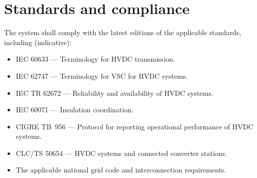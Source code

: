 \section{Standards and compliance}

The system shall comply with the latest editions of the applicable standards,
including (indicative):

\begin{itemize}\setlength{\itemsep}{0.15em}
  \item IEC 60633 --- Terminology for HVDC transmission.
  \item IEC 62747 --- Terminology for VSC for HVDC systems.
  \item IEC TR 62672 --- Reliability and availability of HVDC systems.
  \item IEC 60071 --- Insulation coordination.
  \item CIGRE TB~956 --- Protocol for reporting operational performance of HVDC
        systems.
  \item CLC/TS 50654 --- HVDC systems and connected converter stations.
  \item The applicable national grid code and interconnection requirements.
\end{itemize}
